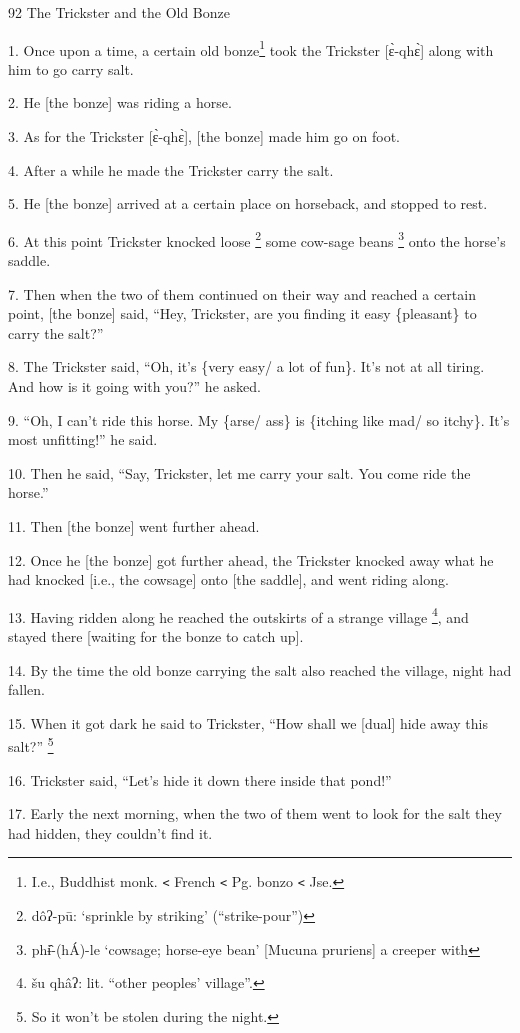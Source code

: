 
92 The Trickster and the Old Bonze

1. Once upon a time, a certain old bonze\footnote{I.e., Buddhist monk. \texttt{<} French \texttt{<} Pg. bonzo \texttt{<} Jse.} took the Trickster [ɛ̀-qhɛ̀] along
with him to go carry salt.

2. He [the bonze] was riding a horse.

3. As for the Trickster [ɛ̀-qhɛ̀], [the bonze] made him go on foot.

4. After a while he made the Trickster carry the salt.

5. He [the bonze] arrived at a certain place on horseback, and stopped to rest.

6. At this point Trickster knocked loose \footnote{dôʔ-pū: `sprinkle by striking' (``strike-pour'')} some cow-sage beans \footnote{phɨ̂-(hÁ)-le `cowsage; horse-eye bean' [Mucuna pruriens] a creeper with} onto the horse's
saddle.

7. Then when the two of them continued on their way and reached a certain point,
[the bonze] said, ``Hey, Trickster, are you finding it easy \{pleasant\} to carry
the salt?''

8. The Trickster said, ``Oh, it's \{very easy/ a lot of fun\}. It's not at all
tiring. And how is it going with you?'' he asked.

9. ``Oh, I can't ride this horse. My \{arse/ ass\} is \{itching like mad/ so itchy\}.
It's most unfitting!'' he said.

10. Then he said, ``Say, Trickster, let me carry your salt. You come ride the horse.''

11. Then [the bonze] went further ahead.

12. Once he [the bonze] got further ahead, the Trickster knocked away what he had
knocked [i.e., the cowsage] onto [the saddle], and went riding along.

13. Having ridden along he reached the outskirts of a strange village \footnote{šu qhâʔ: lit. ``other peoples' village''.}, and
stayed there [waiting for the bonze to catch up].

14. By the time the old bonze carrying the salt also reached the village, night
had fallen.

15. When it got dark he said to Trickster, ``How shall we [dual] hide away this
salt?'' \footnote{So it won't be stolen during the night.}

16. Trickster said, ``Let's hide it down there inside that pond!''

17. Early the next morning, when the two of them went to look for the salt they
had hidden, they couldn't find it.

